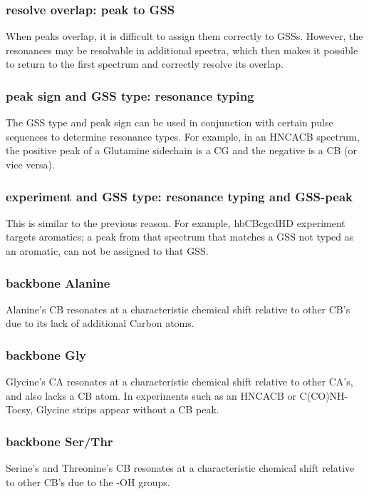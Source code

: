 \subsubsection{resolve overlap: peak to GSS}
When peaks overlap, it is difficult to assign them correctly to GSSs.  However,
the resonances may be resolvable in additional spectra, which then makes it
possible to return to the first spectrum and correctly resolve its overlap.

\subsubsection{peak sign and GSS type: resonance typing}
The GSS type and peak sign can be used in conjunction with certain pulse 
sequences to determine resonance types.  For example, in an HNCACB spectrum, 
the positive peak of a Glutamine sidechain is a CG and the negative is a CB 
(or vice versa).

\subsubsection{experiment and GSS type: resonance typing and GSS-peak}
This is similar to the previous reason.  
For example, hbCBcgcdHD experiment targets aromatics; a peak from that spectrum
that matches a GSS not typed as an aromatic, can not be assigned 
to that GSS.

\subsubsection{backbone Alanine}
Alanine's CB resonates at a characteristic chemical shift relative to other 
CB's due to its lack of additional Carbon atoms.

\subsubsection{backbone Gly}
Glycine's CA resonates at a characteristic chemical shift relative to other
CA's, and also lacks a CB atom.  In experiments such as an HNCACB or C(CO)NH-Tocsy,
Glycine strips appear without a CB peak.

\subsubsection{backbone Ser/Thr}
Serine's and Threonine's CB resonates at a characteristic chemical shift relative
to other CB's due to the -OH groups.

